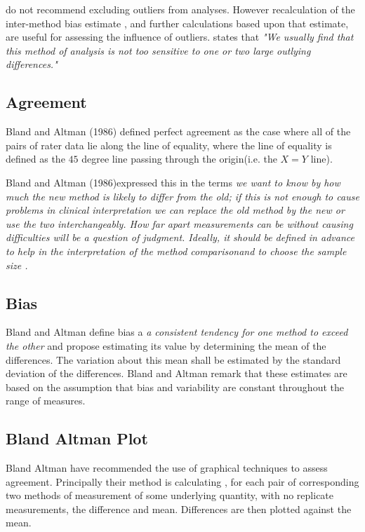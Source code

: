 \documentclass[Main.tex]{subfiles}
\begin{document}
	\citet*{BA99} do not recommend excluding outliers from analyses.
	However recalculation of the inter-method bias estimate , and
	further calculations based upon that estimate, are useful for
	assessing the influence of outliers.\citep{BA99} states that
	\emph{"We usually find that this method of analysis is not too
		sensitive to one or two large outlying differences."}
	


	\subsection{Agreement} Bland and Altman (1986) defined perfect
	agreement as the case where all of the pairs of rater data lie
	along the line of equality, where the line of equality is defined
	as the $45$ degree line passing through the origin(i.e. the $X=Y$
	line).
	
	Bland and Altman (1986)expressed this in the terms \emph{we want
		to know by how much the new method is likely to differ from the
		old; if this is not enough to cause problems in clinical
		interpretation we can replace the old method by the new or use the
		two interchangeably. How far apart measurements can be without
		causing difficulties will be a question of judgment. Ideally, it
		should be defined in advance to help in the interpretation of the
		method comparisonand to choose the sample size .}
	\subsection{Bias}
	Bland and Altman define bias a \emph{a consistent tendency for one
		method to exceed the other} and propose estimating its value
	by determining the mean of the differences. The variation about
	this mean shall be estimated by the  standard deviation of the
	differences. Bland and Altman remark that these estimates are based on the
	assumption that bias and variability are constant throughout the
	range of measures.

	
	\subsection{Bland Altman Plot}
	Bland Altman have recommended the use of graphical techniques to
	assess agreement. Principally their method is calculating , for
	each pair of corresponding two methods of measurement of some
	underlying quantity, with no replicate measurements, the
	difference and mean. Differences are then plotted against the
	mean.
	
\end{document}
